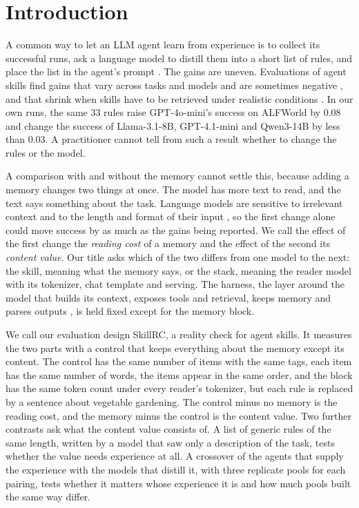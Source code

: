 \section{Introduction}
\label{sec:intro}

A common way to let an LLM agent learn from experience is to collect its successful runs, ask a language
model to distill them into a short list of rules, and place the list in the agent's prompt
\citep{zhao2023expel,shinn2023reflexion,wang2025awm}. The gains are uneven. Evaluations of agent skills
find gains that vary across tasks and models and are sometimes negative
\citep{li2026skillsbench,han2026sweskills}, and that shrink when skills have to be retrieved under
realistic conditions \citep{liu2026wildskills}. In our own runs, the same 33 rules raise GPT-4o-mini's
success on ALFWorld by 0.08 and change the success of Llama-3.1-8B, GPT-4.1-mini and Qwen3-14B by less
than 0.03. A practitioner cannot tell from such a result whether to change the rules or the model.

A comparison with and without the memory cannot settle this, because adding a memory changes two things
at once. The model has more text to read, and the text says something about the task. Language models
are sensitive to irrelevant context and to the length and format of their input
\citep{shi2023distracted,levy2024sametask,sclar2023quantifying}, so the first change alone could move
success by as much as the gains being reported. We call the effect of the first change the
\emph{reading cost} of a memory and the effect of the second its \emph{content value}. Our title asks
which of the two differs from one model to the next: the skill, meaning what the memory says, or the
stack, meaning the reader model with its tokenizer, chat template and serving. The harness, the layer
around the model that builds its context, exposes tools and retrieval, keeps memory and parses outputs
\citep{huang2026memoharness,lee2026metaharness}, is held fixed except for the memory block.

We call our evaluation design SkillRC, a reality check for agent skills. It measures the two parts with
a control that keeps everything about the memory except its content. The control has the same number of
items with the same tags, each item has the same number of words, the items appear in the same order,
and the block has the same token count under every reader's tokenizer, but each rule is replaced by a
sentence about vegetable gardening. The control minus no memory is the reading cost, and the memory minus
the control is the content value. Two further contrasts ask what the content value consists of. A list of
generic rules of the same length, written by a model that saw only a description of the task, tests
whether the value needs experience at all. A crossover of the agents that supply the experience with the
models that distill it, with three replicate pools for each pairing, tests whether it matters whose
experience it is and how much pools built the same way differ.

